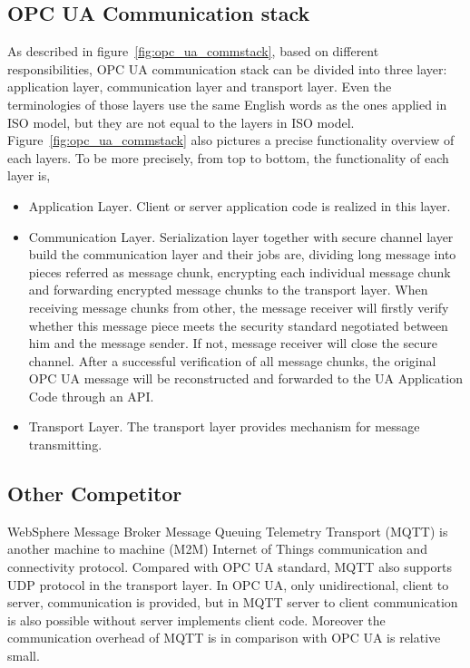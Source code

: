 \subsection{OPC UA Communication stack}
As described in figure~\ref{fig:opc_ua_commstack}, based on different responsibilities, OPC UA communication stack can be divided into three layer: application layer, communication layer and transport layer. Even the terminologies of those layers use the same English words as the ones applied in ISO model, but they are not equal to the layers in ISO model. Figure~\ref{fig:opc_ua_commstack} also pictures a precise functionality overview of each layers. To be more precisely, from top to bottom, the functionality of each layer is,
\begin{itemize}
\item{Application Layer}. Client or server application code is realized in this layer.

\item{Communication Layer}. Serialization layer together with secure channel layer build the communication layer and their jobs are, dividing long message into pieces referred as message chunk, encrypting each individual message chunk and forwarding encrypted message chunks to the transport layer. When receiving message chunks from other, the message receiver will firstly verify whether this message piece meets the security standard negotiated between him and the message sender. If not, message receiver will close the secure channel. After a successful verification of all message chunks, the original OPC UA message will be reconstructed and forwarded to the UA Application Code through an API. 

\item{Transport Layer}. The transport layer provides mechanism for message transmitting.
\end{itemize}

\subsection{Other Competitor}
WebSphere Message Broker Message Queuing Telemetry Transport (MQTT)\cite{Ref3} is another machine to machine (M2M) Internet of Things communication and connectivity protocol. Compared with OPC UA standard, MQTT also supports UDP protocol in the transport layer. In OPC UA, only unidirectional, client to server, communication is provided, but in MQTT server to client communication is also possible without server implements client code. Moreover the communication overhead of MQTT is in comparison with OPC UA is relative small. 


